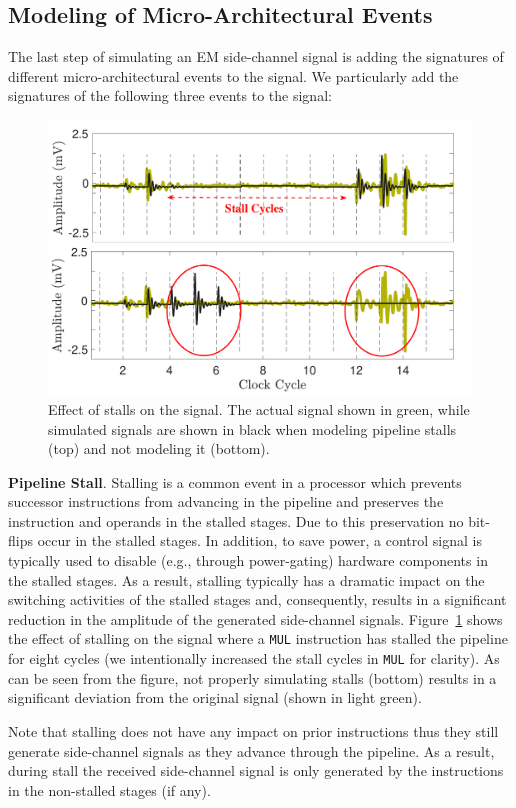 \documentclass[11 pt]{article}
\begin{document}
\subsection{Modeling of Micro-Architectural Events}
The last step  of simulating an EM side-channel signal is adding the signatures of different micro-architectural events to the signal. We particularly add the signatures of the following three events to the signal: \\
\begin{figure}
	\centering
	\includegraphics[width=0.4\columnwidth,clip]{figure/stall2.pdf}
	\caption{Effect of stalls on the signal. The actual signal shown in green, while simulated signals are shown in black when modeling pipeline stalls (top) and not modeling it (bottom).}
	\label{fig:stall}
\end{figure}

\noindent\textbf{Pipeline Stall}. Stalling is a common event in a processor which prevents successor instructions from advancing in the pipeline and preserves the instruction and operands in the stalled stages. Due to this preservation no bit-flips occur in the stalled stages. In addition, to save power, a control signal is typically used to disable (e.g., through power-gating) hardware components in the stalled stages. As a result, stalling typically has a dramatic impact on the switching activities of the stalled stages and, consequently, results in a significant reduction in the amplitude of the generated side-channel signals. Figure~\ref{fig:stall} shows the effect of stalling on the signal where a {\tt MUL} instruction has stalled the pipeline for eight cycles (we intentionally increased the stall cycles in {\tt MUL} for clarity). As can be seen from the figure, not properly simulating stalls (bottom) results in a significant deviation from the original signal (shown in light green).

Note that stalling does not have any impact on prior instructions thus they still generate side-channel signals as they advance through the pipeline. As a result, during stall the received side-channel signal is only generated by the instructions in the non-stalled stages (if any).
\end{document}
